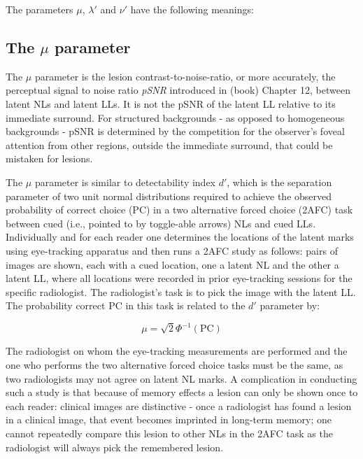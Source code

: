 \documentclass[
]{book}
\begin{document}
The parameters \(\mu\), \(\lambda'\) and \(\nu'\) have the following meanings:

\hypertarget{rsm-mu-parameter}{%
\subsection{\texorpdfstring{The \(\mu\) parameter}{The \textbackslash mu parameter}}\label{rsm-mu-parameter}}

The \(\mu\) parameter is the lesion contrast-to-noise-ratio, or more accurately, the perceptual signal to noise ratio \emph{pSNR} introduced in (book) Chapter 12, between latent NLs and latent LLs. It is not the pSNR of the latent LL relative to its immediate surround. For structured backgrounds - as opposed to homogeneous backgrounds - pSNR is determined by the competition for the observer's foveal attention from other regions, outside the immediate surround, that could be mistaken for lesions.

The \(\mu\) parameter is similar to detectability index \(d'\), which is the separation parameter of two unit normal distributions required to achieve the observed probability of correct choice (PC) in a two alternative forced choice (2AFC) task between cued (i.e., pointed to by toggle-able arrows) NLs and cued LLs. Individually and for each reader one determines the locations of the latent marks using eye-tracking apparatus and then runs a 2AFC study as follows: pairs of images are shown, each with a cued location, one a latent NL and the other a latent LL, where all locations were recorded in prior eye-tracking sessions for the specific radiologist. The radiologist's task is to pick the image with the latent LL. The probability correct \(\text{PC}\) in this task is related to the \(d'\) parameter by:

\begin{equation} 
\mu = \sqrt{2} \Phi^{-1} \left ( \text{PC} \right )
\label{eq:rsm-mu-2afc}
\end{equation}

The radiologist on whom the eye-tracking measurements are performed and the one who performs the two alternative forced choice tasks must be the same, as two radiologists may not agree on latent NL marks. A complication in conducting such a study is that because of memory effects a lesion can only be shown once to each reader: clinical images are distinctive - once a radiologist has found a lesion in a clinical image, that event becomes imprinted in long-term memory; one cannot repeatedly compare this lesion to other NLs in the 2AFC task as the radiologist will always pick the remembered lesion.
\end{document}
